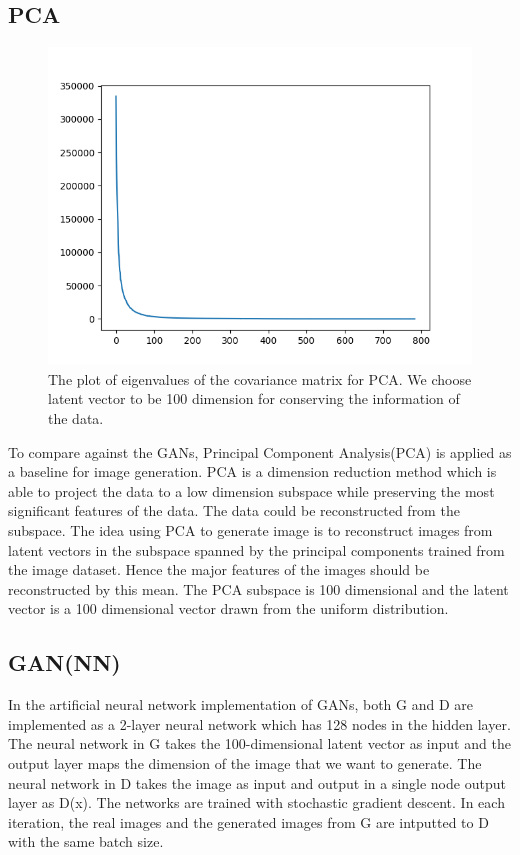 \documentclass[10pt,twocolumn,letterpaper]{article}
\begin{document}
\subsection{PCA}
\begin{figure}[h]
\begin{center}
   \includegraphics[width=0.8\linewidth]{img/pcaeigplot.png}
\end{center}
   \caption{The plot of eigenvalues of the covariance matrix for PCA. We choose latent vector to be 100 dimension for conserving the information of the data.}
\label{fig:long}
\label{fig:onecol}
\end{figure}
To compare against the GANs, Principal Component Analysis(PCA)\cite{jolliffe2002principal} is applied as a baseline for image generation. PCA is a dimension reduction method which is able to project the data to a low dimension subspace while preserving the most significant features of the data. The data could be reconstructed from the subspace. The idea using PCA to generate image is to reconstruct images from latent vectors in the subspace spanned by the principal components trained from the image dataset. Hence the major features of the images should be reconstructed by this mean. The PCA subspace is 100 dimensional and the latent vector is a 100 dimensional vector drawn from the uniform distribution.
\subsection{GAN(NN)}
In the artificial neural network implementation of GANs, both G and D are implemented as a 2-layer neural network which has 128 nodes in the hidden layer. The neural network in G takes the 100-dimensional latent vector as input and the output layer maps the dimension of the image that we want to generate. The neural network in D takes the image as input and output in a single node output layer as D(x). The networks are trained with stochastic gradient descent. In each iteration, the real images and the generated images from G are intputted to D with the same batch size.
\end{document}
